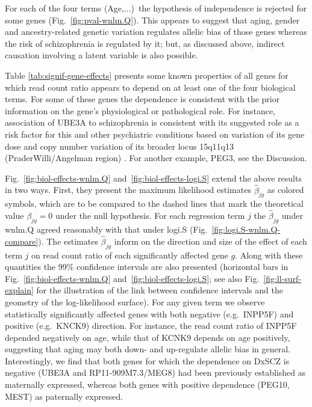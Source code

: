 \documentclass[12pt,letterpaper]{article}
\begin{document}
For each of the four terms (Age,...)~the hypothesis of independence is
rejected for some genes (Fig.~\ref{fig:pval-wnlm.Q}). This appears to suggest
that aging, gender and ancestry-related genetic variation regulates allelic
bias of those genes whereas the risk of schizophrenia is regulated by it; but,
as discussed above, indirect causation involving a latent variable is also
possible.

Table \ref{tab:signif-gene-effects} presents some known properties of all
genes for which read count ratio appears to depend on at least one of the four
biological terms. For some of these genes the dependence is consistent with
the prior information on the gene's physiological or pathological role.  For
instance, association of UBE3A to schizophrenia is consistent with its
suggested role as a risk factor for this and other psychiatric conditions
based on variation of its gene dose and copy number variation of its broader
locus 15q11q13 (PraderWilli/Angelman region) \cite{Sullivan2012,
McNamara2013}.  For another example, PEG3, see the Discussion.

Fig.~\ref{fig:biol-effects-wnlm.Q} and~\ref{fig:biol-effects-logi.S} extend
the above results in two ways. First, they present the maximum likelihood
estimates \(\hat\beta_{jg}\) as colored symbols, which are to be compared to
the dashed lines that mark the theoretical value \(\beta_{jg} = 0\) under the
null hypothesis.  For each regression term \(j\) the \(\hat\beta_{jg}\) under
wnlm.Q agreed reasonably with that under logi.S
(Fig.~\ref{fig:logi.S-wnlm.Q-compare}).  The estimates \(\hat\beta_{jg}\)
inform on the direction and size of the effect of each term \(j\) on read
count ratio of each significantly affected gene \(g\).  Along with these
quantities the 99\% confidence intervals are also presented (horizontal bars
in Fig.~\ref{fig:biol-effects-wnlm.Q} and~\ref{fig:biol-effects-logi.S}; see
also Fig.~\ref{fig:ll-surf-explain} for the illustration of the link between
confidence intervals and the geometry of the log-likelihood surface). For any
given term we observe statistically significantly affected genes with both
negative (e.g.~INPP5F) and positive (e.g.~KNCK9) direction.  For instance, the
read count ratio of INPP5F depended negatively on age, while that of KCNK9
depends on age positively, suggesting that aging may both down- and
up-regulate allelic bias in general. Interestingly, we find that both genes
for which the dependence on DxSCZ is negative (UBE3A and RP11-909M7.3/MEG8)
had been previously established as maternally expressed, whereas both genes
with positive dependence (PEG10, MEST) as paternally expressed.
\end{document}
